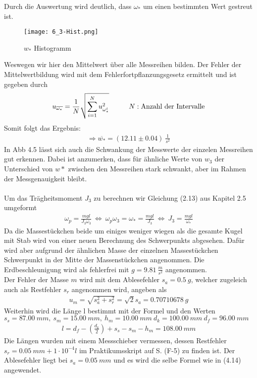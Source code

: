 Durch die Auswertung wird deutlich, dass $\omega_*$ um einen bestimmten Wert gestreut ist. 
\begin{figure}[ht]
    \centering
    \caption{$w_*$ Histogramm}
    \texttt{[image: 6\_3-Hist.png]}
\end{figure}
Weswegen wir hier den Mittelwert über alle Messreihen bilden. Der Fehler der Mittelwertbildung wird mit dem Fehlerfortpflanzungsgesetz ermittelt und ist gegeben durch
\begin{align}
    u_{\overline{\omega_*}}=\frac{1}{N}\sqrt{\sum_{i=1}^{N} u_{\omega_*^i}^2}\tab N:\text{Anzahl der Intervalle}
\end{align}
Somit folgt das Ergebnis:
\begin{align*}
    \Rightarrow\boxed{\overline{w_*}=(12.11 \pm 0.04)~\frac{1}{s^2}}
\end{align*}
In Abb 4.5 lässt sich auch die Schwankung der Messwerte der einzelen Messreihen gut erkennen. Dabei ist anzumerken, dass für ähnliche Werte von $w_3$ der Unterschied von $w*$ zwischen den Messreihen stark schwankt, aber im Rahmen der Messgenauigkeit bleibt.\\ \\
Um das Trägheitsmoment $J_3$ zu berechnen wir Gleichung (2.13) aus Kapitel 2.5 umgeformt
\begin{align}
    \omega_p = \frac{mgl}{J_3\omega_3}~\Leftrightarrow~\omega_p\omega_3 = \omega_* = \frac{mgl}{J_3}~\Leftrightarrow~J_3 = \frac{mgl}{\omega_*}
\end{align}
Da die Massestückchen beide um einiges weniger wiegen als die gesamte Kugel mit Stab wird von einer neuen Berechnung des Schwerpunkts abgesehen. Dafür wird aber aufgrund der ähnlichen Masse der einzelnen Massestückchen Schwerpunkt in der Mitte der Massenstückchen angenommen. Die Erdbeschleunigung wird als fehlerfrei mit $g=9.81~\frac{m}{s^2}$ angenommen. \\
Der Fehler der Masse $m$ wird mit dem Ablesefehler $s_a=0.5~g$, welcher zugeleich auch als Restfehler $s_r$ angenommen wird, angeben als
\begin{align}
    u_m=\sqrt{s_a^2+s_r^2}=\sqrt{2}s_a=0.70710678~g
\end{align}
Weiterhin wird die Länge l bestimmt mit der Formel und den Werten $s_s=87.00~mm,~s_m=15.00~mm,~h_m=10.00~mm~d_k=100.00~mm~d_f=96.00~mm$
\begin{align}
    l = d_f - \left(\frac{d_k}{2}\right) + s_s - s_m - h_m=108.00~mm 
\end{align}
Die Längen wurden mit einem Messschieber vermessen, dessen Restfehler \\ $s_r=0.05~mm+1\cdot10^{-4}l$ im Praktikumsskript auf S. (F-5) zu finden ist. Der Ablesefehler liegt bei $s_a=0.05~mm$ und es wird die selbe Formel wie in (4.14) angewendet.
